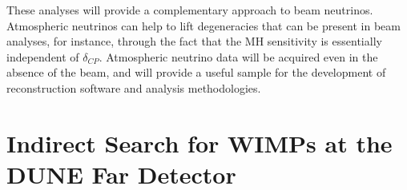 

These analyses will provide a complementary approach to beam neutrinos.   Atmospheric neutrinos can 
help to lift degeneracies that can be present in beam analyses, for instance, through the fact that the 
MH sensitivity is essentially independent of $\delta_{CP}$.   Atmospheric neutrino data will be acquired 
even in the absence of the beam, and will provide a useful sample for the development of 
reconstruction software and analysis methodologies.  

\section{Indirect Search for WIMPs at the DUNE Far Detector}


